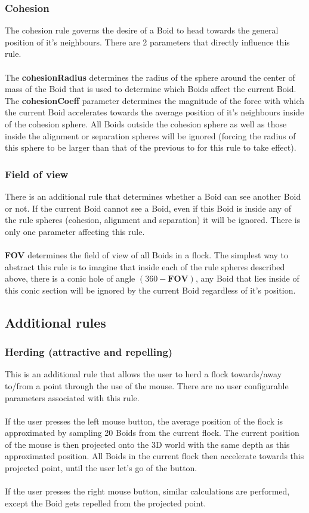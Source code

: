 \documentclass[12pt]{article}
\begin{document}
\subsubsection{Cohesion}
The cohesion rule governs the desire of a Boid to head towards the general position of it's neighbours. There are 2 parameters that directly influence this rule.
\\ \\
The \textbf{cohesionRadius} determines the radius of the sphere around the center of mass of the Boid that is used to determine which Boids affect the current Boid. The \textbf{cohesionCoeff} parameter determines the magnitude of the force with which the current Boid  accelerates towards the average position of it's neighbours inside of the cohesion sphere. All Boids outside the cohesion sphere as well as those inside the alignment or separation spheres will be ignored (forcing the radius of this sphere to be larger than that of the previous to for this rule to take effect).

\subsubsection{Field of view}
There is an additional rule that determines whether a Boid can see another Boid or not. If the current Boid cannot see a Boid, even if this Boid is inside any of the rule spheres (cohesion, alignment and separation) it will be ignored. There is only one parameter affecting this rule.
\\ \\
\textbf{FOV} determines the field of view of all Boids in a flock. The simplest way to abstract this rule is to imagine that inside each of the rule spheres described above, there is a conic hole of angle $(360 - \textbf{FOV})$, any Boid that lies inside of this conic section will be ignored by the current Boid regardless of it's position.

\subsection{Additional rules}
\subsubsection{Herding (attractive and repelling)}
This is an additional rule that allows the user to herd a flock towards/away to/from a point through the use of the mouse. There are no user configurable parameters associated with this rule.
\\ \\
If the user presses the left mouse button, the average position of the flock is approximated by sampling 20 Boids from the current flock. The current position of the mouse is then projected onto the 3D world with the same depth as this approximated position. All Boids in the current flock then accelerate towards this projected point, until the user let's go of the button.
\\ \\
If the user presses the right mouse button, similar calculations are performed, except the Boid gets repelled from the projected point.
\end{document}

